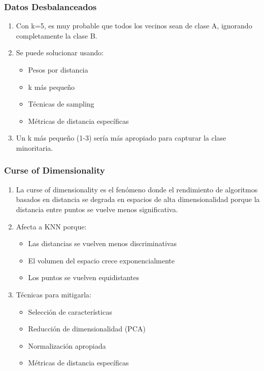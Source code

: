 \documentclass[12pt]{article}
\begin{document}
\subsubsection{Datos Desbalanceados}

\begin{enumerate}
    \item Con k=5, es muy probable que todos los vecinos sean de clase A, ignorando completamente la clase B.
    \item Se puede solucionar usando:
    \begin{itemize}
        \item Pesos por distancia
        \item k más pequeño
        \item Técnicas de sampling
        \item Métricas de distancia específicas
    \end{itemize}
    \item Un k más pequeño (1-3) sería más apropiado para capturar la clase minoritaria.
\end{enumerate}

\subsubsection{Curse of Dimensionality}

\begin{enumerate}
    \item La curse of dimensionality es el fenómeno donde el rendimiento de algoritmos basados en distancia se degrada en espacios de alta dimensionalidad porque la distancia entre puntos se vuelve menos significativa.
    \item Afecta a KNN porque:
    \begin{itemize}
        \item Las distancias se vuelven menos discriminativas
        \item El volumen del espacio crece exponencialmente
        \item Los puntos se vuelven equidistantes
    \end{itemize}
    \item Técnicas para mitigarla:
    \begin{itemize}
        \item Selección de características
        \item Reducción de dimensionalidad (PCA)
        \item Normalización apropiada
        \item Métricas de distancia específicas
    \end{itemize}
\end{enumerate}
\end{document}
